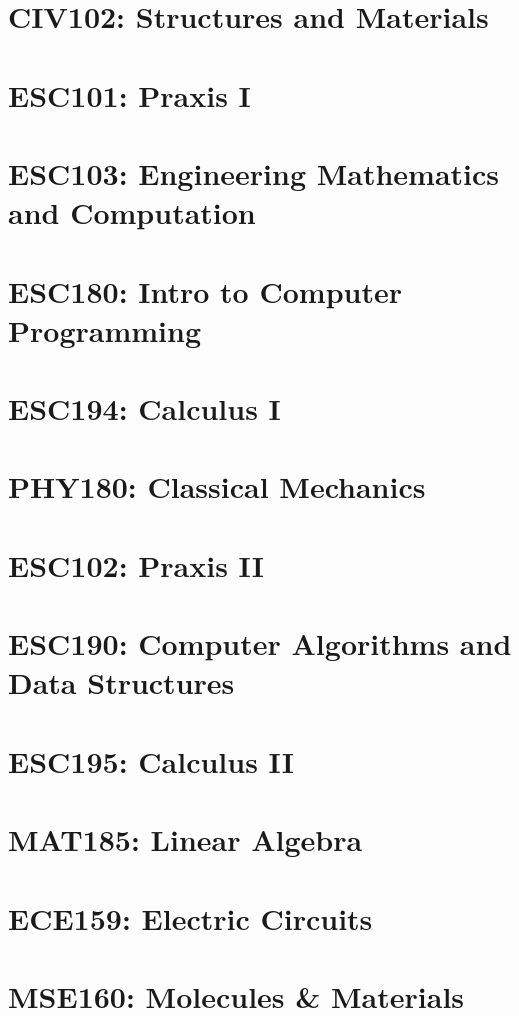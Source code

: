 \section{CIV102: Structures and Materials}

\section{ESC101: Praxis I}

\section{ESC103: Engineering Mathematics and Computation}

\section{ESC180: Intro to Computer Programming}

\section{ESC194: Calculus I}

\section{PHY180: Classical Mechanics}

\section{ESC102: Praxis II}

\section{ESC190: Computer Algorithms and Data Structures}

\section{ESC195: Calculus II}

\section{MAT185: Linear Algebra}

\section{ECE159: Electric Circuits}

\section{MSE160: Molecules \& Materials}

